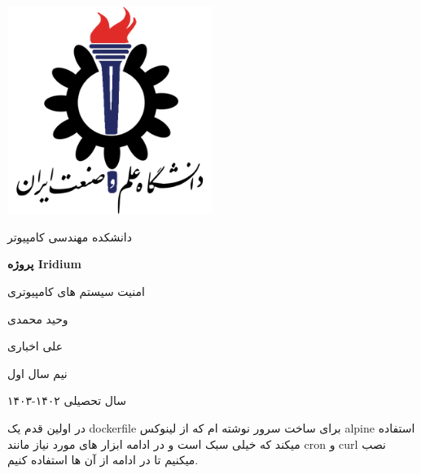 \documentclass{article}
\begin{document}
\begin{titlepage}
  \centering
  \includegraphics[width=0.5\textwidth]{iust.png}\par\vspace{1cm}
  {\scshape\LARGE دانشکده مهندسی کامپیوتر \par}
  \vspace{1cm}
  {\huge\bfseries پروژه Iridium\par}
  \vspace{1cm}
  {\Large امنیت سیستم های کامپیوتری \par}
  \vspace{1cm}
  {\large وحید محمدی \par}
  {\large علی اخباری \par}
  \vspace{5cm}
  {\large نیم سال اول \par}
  {\large سال تحصیلی ۱۴۰۲-۱۴۰۳ \par}
\end{titlepage}
\newpage
\doublespacing
در اولین قدم یک dockerfile برای ساخت سرور نوشته ام که از لینوکس alpine استفاده میکند که خیلی سبک است و در ادامه ابزار های مورد نیاز مانند cron و  curl نصب میکنیم تا در ادامه از آن ها استفاده کنیم.
\end{document}
